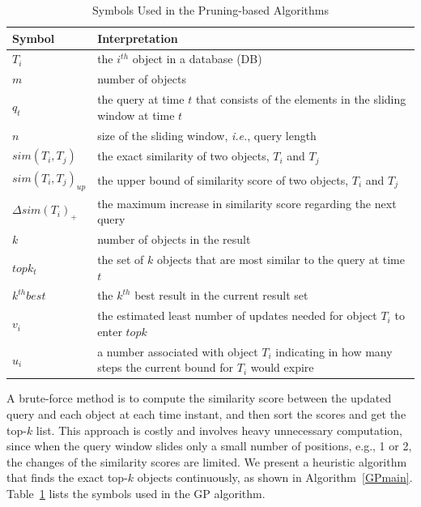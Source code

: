 \begin{table}[t]
\centering
\caption{Symbols Used in the Pruning-based Algorithms}
\begin{tabular}{|l|p{11cm}|} \hline
      Symbol & Interpretation \\ \hline
      $T_i$ & the $i^{th}$ object in a database (DB)\\ \hline
      $m$ & number of objects \\ \hline
      $q_t$ & the query at time $t$ that consists of the elements in the sliding window at time $t$ \\ \hline
      $n$ & size of the sliding window, \emph{i.e.}, query length\\ \hline
      $sim(T_i,T_j)$ & the exact similarity of two objects, $T_i$ and $T_j$\\ \hline
      $sim(T_i, T_j)_{up}$ & the upper bound of similarity score of two objects, $T_i$ and $T_j$\\ \hline
      $\Delta sim(T_i)_{+}$ & the maximum increase in similarity score regarding the next query\\ \hline 
      $k$ & number of objects in the result \\ \hline
      $topk_{t}$ & the set of $k$ objects that are most similar to the query at time $t$\\ \hline
      $k^{th}best$ & the $k^{th}$ best result in the current result set\\ \hline
      $v_i$ & the estimated least number of updates needed for object $T_i$ to enter $topk$ \\ \hline
      $u_i$ & a number associated with object $T_i$ indicating in how many steps the current bound for $T_i$ would expire \\ \hline
\end{tabular}
  \label{Symbols}
\end{table}

A brute-force method is to compute the similarity score between the updated query and each object at each time instant, and then sort the scores and get the top-$k$ list. This approach is costly and involves heavy unnecessary computation, since when the query window slides only a small number of positions, e.g., 1 or 2, the changes of the similarity scores are limited. We present a heuristic algorithm that finds the exact top-$k$ objects continuously, as shown in Algorithm~\ref{GPmain}. Table~\ref{Symbols} lists the symbols used in the GP algorithm.

